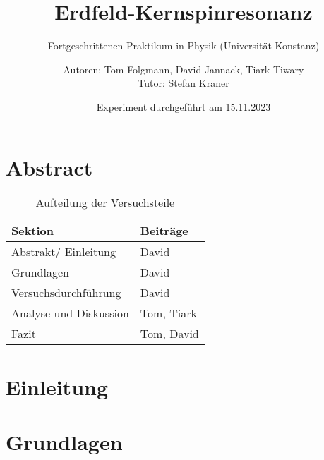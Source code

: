 \documentclass[
    oneside, 
    footinclude=off, 
    captions=tableheading, 
    DIV=12;usenames,
    dvipsnames
]{scrartcl}
\begin{document}
    \title{Erdfeld-Kernspinresonanz}
    \subtitle{Fortgeschrittenen-Praktikum in Physik (Universität Konstanz)}
    \author{Autoren: Tom Folgmann, David Jannack, Tiark Tiwary \\ \large{Tutor: Stefan Kraner}}
    \date{Experiment durchgeführt am 15.11.2023}
    \maketitle
    \thispagestyle{empty}
    \section*{Abstract}
        

    \begin{table}[H]
        \centering
        \begin{tabular}{ll}
             Sektion & Beiträge \\\hline\hline
             Abstrakt/ Einleitung & David \\
             Grundlagen & David \\
             Versuchsdurchführung & David \\
             Analyse und Diskussion & Tom, Tiark \\
             Fazit & Tom, David
        \end{tabular}
        \caption{Aufteilung der Versuchsteile}
        \label{tab:Aufteilung}
    \end{table}

    \newpage


    \tableofcontents
    \thispagestyle{empty}	
    \newpage
    \setcounter{page}{1}


\newpage
\section{Einleitung}
        

\newpage
\section{Grundlagen}
    
\end{document}
